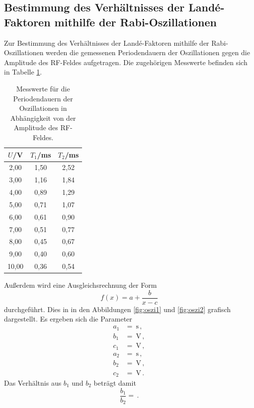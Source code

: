 \subsection{Bestimmung des Verhältnisses der Landé-Faktoren mithilfe der Rabi-Oszillationen}
\label{subsec:oszillationen}
Zur Bestimmung des Verhältnisses der Landé-Faktoren mithilfe der Rabi-Oszillationen werden
die gemessenen Periodendauern der Oszillationen gegen die Amplitude des RF-Feldes aufgetragen.
Die zugehörigen Messwerte befinden sich in Tabelle \ref{tab:oszi}.

\begin{table}[htp]
	\begin{center}
    \caption{Messwerte für die Periodendauern der Oszillationen in Abhängigkeit von der Amplitude des RF-Feldes.}
    \label{tab:oszi}
		\begin{tabular}{ccc}
		\toprule
			{$U$/V} & {$T_1$/ms} & {$T_2$/ms}\\
			\midrule
			2,00 & 1,50 & 2,52\\
			3,00 & 1,16 & 1,84\\
			4,00 & 0,89 & 1,29\\
			5,00 & 0,71 & 1,07\\
			6,00 & 0,61 & 0,90\\
			7,00 & 0,51 & 0,77\\
			8,00 & 0,45 & 0,67\\
			9,00 & 0,40 & 0,60\\
			10,00 & 0,36 & 0,54\\
		\bottomrule
		\end{tabular}
	\end{center}
\end{table}

Außerdem wird eine Ausgleichsrechnung der Form
\begin{equation*}
  f(x)=a+\frac{b}{x-c}
\end{equation*}
durchgeführt. Dies in in den Abbildungen \ref{fig:oszi1} und \ref{fig:oszi2} grafisch dargestellt.
Es ergeben sich die Parameter
\begin{align*}
  a_1&=\SI{}{\second} \,,\\
  b_1&=\SI{}{\volt} \,,\\
  c_1&=\SI{}{\volt} \,,\\
  a_2&=\SI{}{\second} \,,\\
  b_2&=\SI{}{\volt} \,,\\
  c_2&=\SI{}{\volt} \,.
\end{align*}
Das Verhältnis aus $b_1$ und $b_2$ beträgt damit
\begin{equation*}
  \frac{b_1}{b_2}= \,.
\end{equation*}

